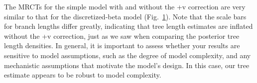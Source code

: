 \begin{figure}[h!]
\label{fig:mk_discretized_majrule}
\end{figure}

The MRCTs for the simple model with and without the +v correction are very similar to that for the discretized-beta model (Fig.~\ref{fig:mk_discretized_majrule}).
Note that the scale bars for branch lengths differ greatly, indicating that tree length estimates are inflated without the +v correction, just as we saw when comparing the posterior tree length densities.
In general, it is important to assess whether your results are sensitive to model assumptions, such as the degree of model complexity, and any mechanistic assumptions that motivate the model's design.
In this case, our tree estimate appears to be robust to model complexity.

